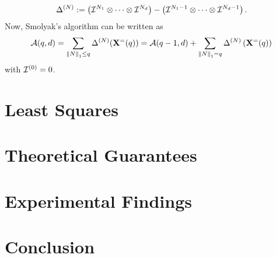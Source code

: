\documentclass[12pt, oneside]{amsart}
\theoremstyle{definition}
\theoremstyle{remark}
\numberwithin{equation}{section}
\begin{document}
\begin{equation}\label{eq:differenceOp}
    \Delta^{(N)} \defn \left(\cI^{N_1} \otimes \cdots \otimes \cI^{N_d}\right) - \left(\cI^{N_1-1} \otimes \cdots \otimes \cI^{N_d-1}\right).
\end{equation}
Now, Smolyak's algorithm can be written as
\begin{equation}\label{eq:SmolyakWithDifferences}
    \cA(q, d) = \sum_{\norm[1]{N} \leq q} \Delta^{(N)}(\XX^=(q)) = \cA(q-1, d) + \sum_{\norm[1]{N}=q} \Delta^{(N)}\left(\XX^=(q)\right)
\end{equation}
with \(\cI^{(0)} = 0\).


\section{Least Squares}


\section{Theoretical Guarantees}


\section{Experimental Findings}


\section{Conclusion}


\newpage
\end{document}
